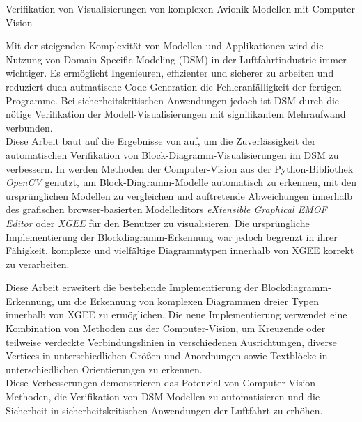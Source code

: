 \label{kurzzusammenfassung}
{\LARGE Verifikation von Visualisierungen von komplexen Avionik Modellen mit Computer Vision}

Mit der steigenden Komplexit{\"a}t von Modellen und Applikationen wird die Nutzung von Domain Specific Modeling (DSM) in der Luftfahrtindustrie immer wichtiger. Es erm{\"o}glicht Ingenieuren, effizienter und sicherer zu arbeiten und reduziert duch autmatische Code Generation die Fehleranf{\"a}lligkeit der fertigen Programme. Bei sicherheitskritischen Anwendungen jedoch ist DSM durch die n{\"o}tige Verifikation der Modell-Visualisierungen mit signifikantem Mehraufwand verbunden.\\
Diese Arbeit baut auf die Ergebnisse von \cite{og_paper} auf, um die Zuverl{\"a}ssigkeit der automatischen Verifikation von Block-Diagramm-Visualisierungen im DSM zu verbessern. In \cite{og_paper} werden Methoden der Computer-Vision aus der Python-Bibliothek \textit{OpenCV} genutzt, um Block-Diagramm-Modelle automatisch zu erkennen, mit den urspr{\"u}nglichen Modellen zu vergleichen und auftretende Abweichungen innerhalb des grafischen browser-basierten Modelleditors \textit{eXtensible Graphical EMOF Editor} oder \textit{XGEE} f{\"u}r den Benutzer zu visualisieren. Die urspr{\"u}ngliche Implementierung der Blockdiagramm-Erkennung war jedoch begrenzt in ihrer F{\"a}higkeit, komplexe und vielf{\"a}ltige Diagrammtypen innerhalb von XGEE korrekt zu verarbeiten.

Diese Arbeit erweitert die bestehende Implementierung der Blockdiagramm-Erkennung, um die Erkennung von komplexen Diagrammen dreier Typen innerhalb von XGEE zu erm{\"o}glichen. Die neue Implementierung verwendet eine Kombination von Methoden aus der Computer-Vision, um Kreuzende oder teilweise verdeckte Verbindungslinien in verschiedenen Ausrichtungen, diverse Vertices in unterschiedlichen Gr{\"o}{\ss}en und Anordnungen sowie Textbl{\"o}cke in unterschiedlichen Orientierungen zu erkennen.\\
Diese Verbesserungen demonstrieren das Potenzial von Computer-Vision-Methoden, die Verifikation von DSM-Modellen zu automatisieren und die Sicherheit in sicherheitskritischen Anwendungen der Luftfahrt zu erh{\"o}hen.